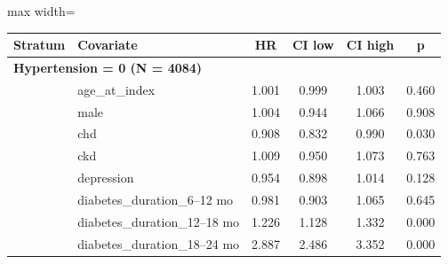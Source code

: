 \documentclass[twoside,11pt]{article}
\begin{document}
\begin{table}[H]
  \centering
  \begin{adjustbox}{max width=\textwidth}
    \begin{tabular}{llcccc}
      \hline
      \textbf{Stratum} & \textbf{Covariate}            & \textbf{HR} & \textbf{CI low} & \textbf{CI high} & \textbf{p}                  \\
      \hline

      \multicolumn{6}{l}{\textbf{Hypertension = 0 (N = 4084)}}                                                                          \\
                       & age\_at\_index                & 1.001       & 0.999           & 1.003            & 0.460                       \\
                       & male                          & 1.004       & 0.944           & 1.066            & 0.908                       \\
                       & chd                           & 0.908       & 0.832           & 0.990            & \cellcolor{lightgreen}0.030 \\
                       & ckd                           & 1.009       & 0.950           & 1.073            & 0.763                       \\
                       & depression                    & 0.954       & 0.898           & 1.014            & 0.128                       \\
                       & diabetes\_duration\_6--12 mo  & 0.981       & 0.903           & 1.065            & 0.645                       \\
                       & diabetes\_duration\_12--18 mo & 1.226       & 1.128           & 1.332            & \cellcolor{lightgreen}0.000 \\
                       & diabetes\_duration\_18--24 mo & 2.887       & 2.486           & 3.352            & \cellcolor{lightgreen}0.000 \\


\end{tabular}
\end{adjustbox}
\end{table}
\end{document}
